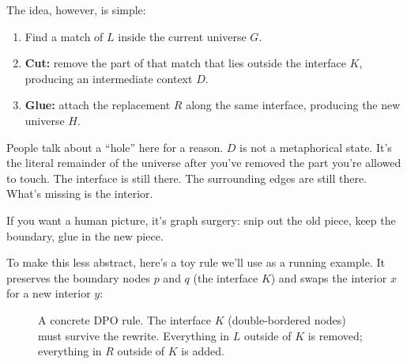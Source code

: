 The idea, however, is simple:

\begin{enumerate}
    \item Find a match of $L$ inside the current universe $G$.
    \item \textbf{Cut:} remove the part of that match that lies outside the interface $K$, producing an intermediate context $D$.
    \item \textbf{Glue:} attach the replacement $R$ along the same interface, producing the new universe $H$.
\end{enumerate}

People talk about a ``hole'' here for a reason. $D$ is not a metaphorical state. It's the literal remainder of the universe after you've removed the part you're allowed to touch. The interface is still there. The surrounding edges are still there. What's missing is the interior.

If you want a human picture, it's graph surgery: snip out the old piece, keep the boundary, glue in the new piece.

To make this less abstract, here's a toy rule we'll use as a running example. It preserves the boundary nodes $p$ and $q$ (the interface $K$) and swaps the interior $x$ for a new interior $y$:

\begin{figure}[h]
\centering
\caption{A concrete DPO rule. The interface $K$ (double-bordered nodes) must survive the rewrite. Everything in $L$ outside of $K$ is removed; everything in $R$ outside of $K$ is added.}
\label{fig:dpo-rule-example}
\end{figure}


